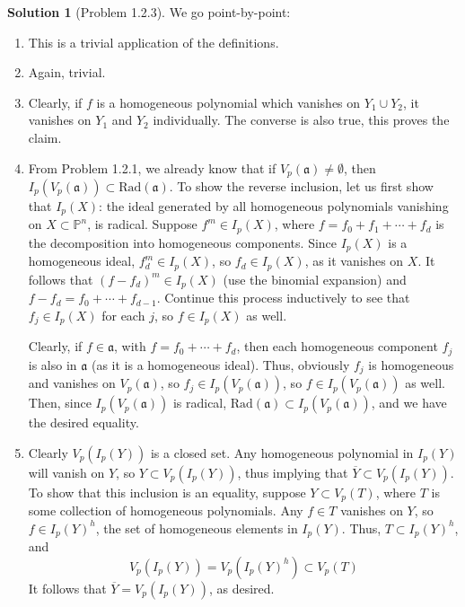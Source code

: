 \documentclass[aps,pra,showpacs,notitlepage,onecolumn,superscriptaddress,nofootinbib]{revtex4-1}
\theoremstyle{definition}
\newtheorem{solution}{Solution}[section]
\begin{document}
\begin{solution}[Problem 1.2.3]
We go point-by-point:
\begin{enumerate}
  \item This is a trivial application of the definitions.
    \item Again, trivial.
      \item Clearly, if $f$ is a homogeneous polynomial which vanishes on $Y_1 \cup Y_2$, it vanishes on $Y_1$ and $Y_2$ individually. The
        converse is also true, this proves the claim.
        \item From Problem 1.2.1, we already know that if $V_p(\mathfrak{a}) \neq \emptyset$, then $I_p(V_p(\mathfrak{a})) \subset \text{Rad}(\mathfrak{a})$. To show the reverse inclusion, let us first show that $I_p(X)$: the ideal generated
          by all homogeneous polynomials vanishing on $X \subset \mathbb{P}^n$, is radical. Suppose $f^m \in I_p(X)$, where $f = f_0 + f_1 + \cdots + f_d$ is the decomposition into homogeneous components. Since $I_p(X)$ is a homogeneous ideal, $f_d^{m} \in I_p(X)$, so
          $f_d \in I_p(X)$, as it vanishes on $X$. It follows that $(f - f_d)^m \in I_p(X)$ (use the binomial expansion) and $f - f_d = f_0 + \cdots + f_{d - 1}$. Continue this process inductively to see that $f_j \in I_p(X)$ for each $j$, so $f \in I_p(X)$ as well.

          Clearly, if $f \in \mathfrak{a}$, with $f = f_0 + \cdots + f_d$, then each homogeneous component $f_j$ is also in $\mathfrak{a}$ (as it is a homogeneous ideal). Thus, obviously $f_j$ is homogeneous and vanishes on $V_p(\mathfrak{a})$, so $f_j \in I_p(V_p(\mathfrak{a}))$,
          so $f \in I_p(V_p(\mathfrak{a}))$ as well. Then, since $I_p(V_p(\mathfrak{a}))$ is radical, $\text{Rad}(\mathfrak{a}) \subset I_p(V_p(\mathfrak{a}))$, and we have the desired equality.
          \item Clearly $V_p(I_p(Y))$ is a closed set. Any homogeneous polynomial in $I_p(Y)$ will vanish on $Y$, so $Y \subset V_p(I_p(Y))$, thus implying that $\overline{Y} \subset V_p(I_p(Y))$. To show that this inclusion is an equality, suppose $Y \subset V_p(T)$,
            where $T$ is some collection of homogeneous polynomials. Any $f \in T$ vanishes on $Y$, so $f \in I_p(Y)^{h}$, the set of homogeneous elements in $I_p(Y)$. Thus, $T \subset I_p(Y)^{h}$, and
            \begin{equation}
              V_p(I_p(Y)) = V_p(I_p(Y)^{h}) \subset V_p(T)
              \end{equation}
            It follows that $\overline{Y} = V_p(I_p(Y))$, as desired.
  \end{enumerate}
  \end{solution}
\end{document}
